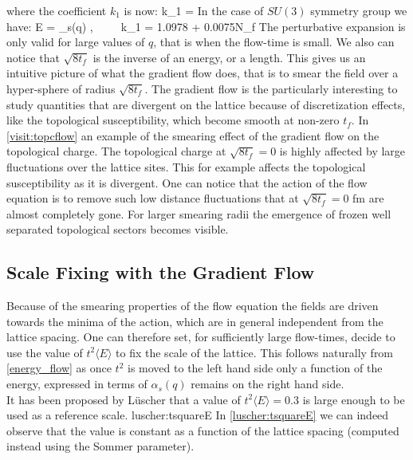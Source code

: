 \eeq
where the coefficient $k_1$ is now:
\beq
   k_1 =   
\eeq
In the case of $SU(3)$ symmetry group we have:
\beq
    \langle E \rangle =  \alpha_s(q) ,~~~~~k_1 = 1.0978 + 0.0075\times N_f
    \label{energy_flow}
\eeq
The perturbative expansion is only valid for large values of $q$, that is when the flow-time is small. We also can notice that $\sqrt{8t_f}$ is the inverse of an energy, or a length. This gives us an intuitive picture of what the gradient flow does, that is to smear the field over a hyper-sphere of radius $\sqrt{8t_f}$. The gradient flow is the particularly interesting to study quantities that are divergent on the lattice because of discretization effects, like the topological susceptibility, which become smooth at non-zero $t_f$. In \cref{visit:topcflow} an example of the smearing effect of the gradient flow on the topological charge. 
The topological charge at $\sqrt{8t_f} = 0$ is highly affected by large fluctuations over the lattice sites. This for example affects the topological susceptibility as it is divergent. One can notice that the action of the flow equation is to remove such low distance fluctuations that at $\sqrt{8t_f} = 0$ fm are almost completely gone. For larger smearing radii the emergence of frozen well separated topological sectors becomes visible.

\subsection{Scale Fixing with the Gradient Flow}
\label{sec:scale_fixing}
Because of the smearing properties of the flow equation the fields are driven towards the minima of the action, which are in general independent from the lattice spacing. One can therefore set, for sufficiently large flow-times, decide to use the value of $t^2\langle E\rangle$ to fix the scale of the lattice. This follows naturally from \cref{energy_flow} as once $t^2$ is moved to the left hand side only a function of the energy, expressed in terms of $\alpha_s(q)$ remains on the right hand side. \\
It has been proposed by L{\"u}scher that a value of $t^2\langle E\rangle = 0.3$ is large enough to be used as a reference scale. 
 {luscher:tsquareE}
In \cref{luscher:tsquareE} we can indeed observe that the value is constant as a function of the lattice spacing (computed instead using the Sommer parameter).


